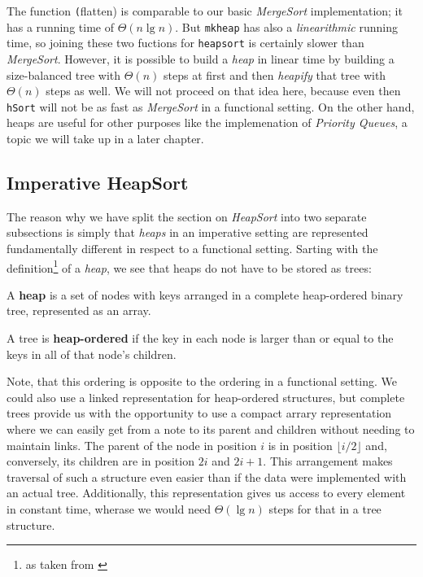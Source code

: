 The function \texttt(flatten) is comparable to our basic \emph{MergeSort} implementation; it has a running time of $\Theta(n \lg n)$.
But \texttt{mkheap} has also a \emph{linearithmic} running time, so joining these two fuctions for \texttt{heapsort} is certainly slower than \emph{MergeSort}.
However, it is possible to build a \emph{heap} in linear time by building a size-balanced tree with $\Theta(n)$ steps at first and then \emph{heapify} that tree with $\Theta(n)$ steps as well.
We will not proceed on that idea here, because even then \texttt{hSort} will not be as fast as \emph{MergeSort} in a functional setting.
On the other hand, heaps are useful for other purposes like the implemenation of \emph{Priority Queues}, a topic we will take up in a later chapter.

\subsection{Imperative HeapSort}

The reason why we have split the section on \emph{HeapSort} into two separate subsections is simply that \emph{heaps} in an imperative setting are represented fundamentally different in respect to a functional setting.
Sarting with the definition\footnote{as taken from \autocite[section 9.2][]{algsc98}} of a \emph{heap}, we see that heaps do not have to be stored as trees:

\begin{defn}[Heap]
A \textbf{heap} is a set of nodes with keys arranged in a complete heap-ordered binary tree, represented as an array.
\end{defn}

\begin{defn}
A tree is \textbf{heap-ordered} if the key in each node is larger than or equal to the keys in all of that node's children.
\end{defn}

Note, that this ordering is opposite to the ordering in a functional setting.
We could also use a linked representation for heap-ordered structures, but complete trees provide us with the opportunity to use a compact arrary representation where we can easily get from a note to its parent and children without needing to maintain links.
The parent of the node in position $i$ is in position $\lfloor i/2 \rfloor$ and, conversely, its children are in position $2i$ and $2i+1$.
This arrangement makes traversal of such a structure even easier than if the data were implemented with an actual tree.
Additionally, this representation gives us access to every element in constant time, wherase we would need $\Theta(\lg n)$ steps for that in a tree structure.

